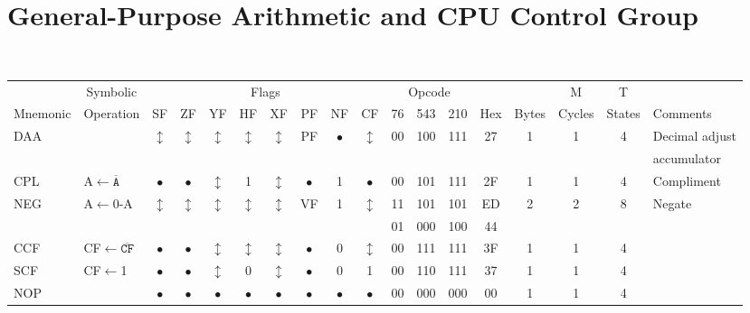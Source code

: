\documentclass[oneside,a4paper]{book}
\begin{document}
\section{General-Purpose Arithmetic and CPU Control Group}

{\tt \scriptsize \setlength{\fboxsep}{0.25mm}
\setlength{\tabcolsep}{1mm}
\begin{tabular}{llc@{ }c@{ }c@{ }c@{ }c@{ }c@{ }c@{ }cc@{ }c@{ }cccccll}\hline
 & \multicolumn{1}{c}{Symbolic} & \multicolumn{8}{c}{Flags} & \multicolumn{3}{c}{Opcode} & & & M & T & \\
Mnemonic & \multicolumn{1}{c}{Operation} & SF & ZF & YF & HF & XF & PF & NF & CF & 76 & 543 & 210 
	& Hex & Bytes & Cycles & States & \multicolumn{2}{l}{Comments} \\ \hline

DAA &  & 
	$\updownarrow$ & $\updownarrow$ & $\updownarrow$ & $\updownarrow$ & $\updownarrow$ & PF & $\bullet$ & $\updownarrow$ & 00 & 100 & 111
	& 27 & 1 & 1 & 4 & \multicolumn{2}{l}{Decimal adjust} \\
 \multicolumn{17}{c}{} & \multicolumn{2}{l}{accumulator}  \\

CPL & A$\leftarrow\mathtt{\overline{A}}$ & 
	$\bullet$ & $\bullet$ & $\updownarrow$ & 1 & $\updownarrow$ & $\bullet$ & 1 & $\bullet$ & 00 & 101 & 111
	& 2F & 1 & 1 & 4 & \multicolumn{2}{l}{Compliment} \\

NEG & A$\leftarrow$0-A & 
	$\updownarrow$ & $\updownarrow$ & $\updownarrow$ & $\updownarrow$ & $\updownarrow$ & VF & 1 & $\updownarrow$ & 11 & 101 & 101 
	& ED & 2 & 2 & 8 & \multicolumn{2}{l}{Negate} \\
\multicolumn{10}{c}{} & 01 & 000 & 100 & 44 & \multicolumn{3}{c}{} & & \\ 

CCF & CF$\leftarrow\mathtt{\overline{CF}}$ & 
	$\bullet$ & $\bullet$ & $\updownarrow$\footnotemark[1] & $\updownarrow$\footnotemark[2] & $\updownarrow$\footnotemark[1] & 
	$\bullet$ & 0 & $\updownarrow$ & 00 & 111 & 111
	& 3F & 1 & 1 & 4 & & \\

SCF & CF$\leftarrow$1 & 
	$\bullet$ & $\bullet$ & $\updownarrow$\footnotemark[1] & 0 & $\updownarrow$\footnotemark[1] & $\bullet$ & 0 & 1 & 00 & 110 & 111
	& 37 & 1 & 1 & 4 & & \\

NOP & & 
	$\bullet$ & $\bullet$ & $\bullet$ & $\bullet$ & $\bullet$ & $\bullet$ & $\bullet$ & $\bullet$ & 00 & 000 & 000
	& 00 & 1 & 1 & 4 & & \\


\end{tabular}}
\end{document}
